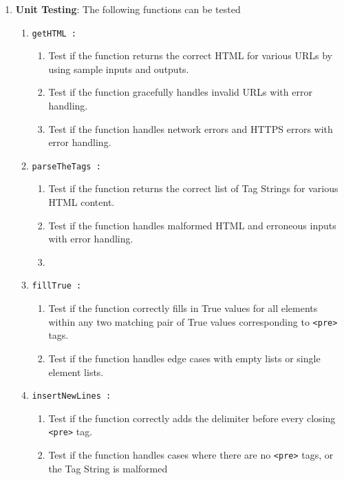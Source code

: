 \documentclass{scrreprt}
\begin{document}
\begin{enumerate}
    \item \textbf{Unit Testing}: The following functions can be tested 
    \begin{enumerate}
        \item \texttt{getHTML : }
        \begin{enumerate}
            \item Test if the function returns the correct HTML for various URLs by using sample inputs and outputs.
            \item Test if the function gracefully handles invalid URLs with error handling.
            \item Test if the function handles network errors and HTTPS errors with error handling.
        \end{enumerate}

        \item \texttt{parseTheTags : }
        \begin{enumerate}
            \item Test if the function returns the correct list of Tag Strings for various HTML content.
            \item Test if the function handles malformed HTML and erroneous inputs with error handling.
            \item 
        \end{enumerate}

        \item \texttt{fillTrue : }
        \begin{enumerate}
            \item Test if the function correctly fills in True values for all elements within any two matching pair of True values corresponding to \texttt{<pre>} tags.
            \item Test if the function handles edge cases with empty lists or single element lists.
        \end{enumerate}

        \item \texttt{insertNewLines : }
        \begin{enumerate}
            \item Test if the function correctly adds the delimiter before every closing \texttt{<pre>} tag.
            \item Test if the function handles cases where there are no \texttt{<pre>} tags, or the Tag String is malformed 
        \end{enumerate}


\end{enumerate}
\end{enumerate}
\end{document}
